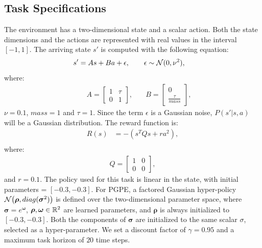 \subsection*{Task Specifications} 
The environment has a two-dimensional state and a scalar action. 
Both the state dimensions and the actions are represented with real values in the interval $[-1, 1]$. The arriving state $s'$ is computed with the following equation:
\begin{align}
s' &= As + Ba + \epsilon, \qquad \epsilon\sim\mathcal{N}(0,\nu^2),\nonumber
\end{align}
where:
\begin{align}
&\quad A =
\begin{bmatrix}
1 & \tau \\
0 & 1 
\end{bmatrix}, &\quad 
B =
\begin{bmatrix}
0 \\
\frac{\tau}{mass} 
\end{bmatrix},\nonumber
\end{align}
$\nu=0.1$, $mass=1$ and $\tau = 1$.
Since the term $\epsilon$ is a Gaussian noise, $P(s'|s,a)$ will be a Gaussian distribution.
The reward function is:
\begin{align}
R(s) &= - (s^TQs + ra^2),\nonumber\\
\end{align}
where:
\begin{align}
Q =
\begin{bmatrix}
1 & 0 \\
0 & 0
\end{bmatrix},
\end{align}
and $r = 0.1 $.
The policy used for this task is linear in the state, with initial parameters = $[-0.3, -0.3]$. For \ac{PGPE}, a factored Gaussian hyper-policy $\mathcal{N}\big(\boldsymbol{\rho},\mathop{diag}(\boldsymbol{\sigma}^2)\big)$ is defined over the two-dimensional parameter space, where $\boldsymbol{\sigma}=e^{\boldsymbol{\omega}}$, $\boldsymbol{\rho},\boldsymbol{\omega}\in\mathbb{R}^2$ are learned parameters, and $\boldsymbol{\rho}$ is always initialized to $[-0.3,-0.3]$. Both the components of $\boldsymbol{\sigma}$ are initialized to the same scalar $\sigma$, selected as a hyper-parameter. 
We set a discount factor of $\gamma=0.95$ and a maximum task horizon of $20$ time steps.
%
